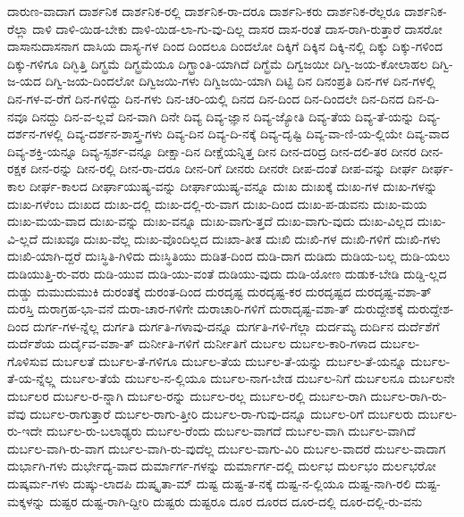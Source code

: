 {ದಾರುಣ-ವಾದಾಗ
ದಾರ್ಶನಿಕ
ದಾರ್ಶನಿಕ-ರಲ್ಲಿ
ದಾರ್ಶನಿಕ-ರಾ-ದರೂ
ದಾರ್ಶನಿ-ಕರು
ದಾರ್ಶನಿಕ-ರೆಲ್ಲರೂ
ದಾರ್ಶನಿಕ-ರೆಲ್ಲಾ
ದಾಳಿ
ದಾಳಿ-ಯಿಡ-ಬೇಕು
ದಾಳಿ-ಯಿಡ-ಲಾ-ಗು-ವು-ದಿಲ್ಲ
ದಾಸರ
ದಾಸ-ರಂತೆ
ದಾಸ-ರಾಗಿ-ರುತ್ತಾರೆ
ದಾಸರೋ
ದಾಸಾನುದಾಸನಾಗ
ದಾಸಿಯ
ದಾಸ್ಯ-ಗಳ
ದಿಂದ
ದಿಂದಲೂ
ದಿಂದಲೋ
ದಿಕ್ಕಿಗೆ
ದಿಕ್ಕಿನ
ದಿಕ್ಕಿ-ನಲ್ಲಿ
ದಿಕ್ಕು
ದಿಕ್ಕು-ಗಳಿಂದ
ದಿಕ್ಕು-ಗಳಿಗೂ
ದಿಗ್ಭಿತ್ತಿ
ದಿಗ್ಭ್ರಮೆ
ದಿಗ್ಭ್ರಮೆಯೂ
ದಿಗ್ಭ್ರಾಂತಿ-ಯಾಗಿದೆ
ದಿಗ್ಭ್ರೆಮೆ
ದಿಗ್ವಜಯೀ
ದಿಗ್ವಿ-ಜಯ-ಕೋಲಾಹಲ
ದಿಗ್ವಿ-ಜ-ಯದ
ದಿಗ್ವಿ-ಜಯ-ದಿಂದಲೋ
ದಿಗ್ವಿಜಯಿ-ಗಳು
ದಿಗ್ವಿಜಯಿ-ಯಾಗಿ
ದಿಟ್ಟಿ
ದಿನ
ದಿನಂಪ್ರತಿ
ದಿನ-ಗಳ
ದಿನ-ಗಳಲ್ಲಿ
ದಿನ-ಗಳ-ವ-ರೆಗೆ
ದಿನ-ಗಳಿದ್ದು
ದಿನ-ಗಳು
ದಿನ-ಚರಿ-ಯಲ್ಲಿ
ದಿನದ
ದಿನ-ದಿಂದ
ದಿನ-ದಿಂದಲೇ
ದಿನ-ದಿನದ
ದಿನ-ದಿ-ನವೂ
ದಿನದ್ದು
ದಿನ-ವ-ಲ್ಲವೆ
ದಿನ-ವಾಗಿ
ದಿನೇ
ದಿವ್ಯ
ದಿವ್ಯ-ಜ್ಞಾನ
ದಿವ್ಯ-ಜ್ಯೋತಿ
ದಿವ್ಯ-ತೆಯ
ದಿವ್ಯ-ತೆ-ಯನ್ನು
ದಿವ್ಯ-ದರ್ಶನ-ಗಳಲ್ಲಿ
ದಿವ್ಯ-ದರ್ಶನ-ಶಾಸ್ತ್ರ-ಗಳು
ದಿವ್ಯ-ದಿನ
ದಿವ್ಯ-ದಿ-ನಕ್ಕೆ
ದಿವ್ಯ-ದೃಷ್ಟಿ
ದಿವ್ಯ-ವಾ-ಣಿ-ಯ-ಲ್ಲಿಯೇ
ದಿವ್ಯ-ವಾದ
ದಿವ್ಯ-ಶಕ್ತಿ-ಯನ್ನೂ
ದಿವ್ಯ-ಸ್ಪರ್ಶ-ವನ್ನೂ
ದೀಕ್ಷಾ-ದಿನ
ದೀಕ್ಷೆಯನ್ನಿತ್ತ
ದೀನ
ದೀನ-ದರಿದ್ರ
ದೀನ-ದಲಿ-ತರ
ದೀನರ
ದೀನ-ರಕ್ಷಕ
ದೀನ-ರನ್ನು
ದೀನ-ರಲ್ಲಿ
ದೀನ-ರಾ-ದರೂ
ದೀನ-ರಿಗೆ
ದೀನರು
ದೀನರೇ
ದೀಪ-ದಂತೆ
ದೀಪ-ವನ್ನು
ದೀರ್ಘ
ದೀರ್ಘ-ಕಾಲ
ದೀರ್ಘ-ಕಾಲದ
ದೀರ್ಘಾಯುಷ್ಯ-ವನ್ನು
ದೀರ್ಘಾಯುಷ್ಯ-ವನ್ನೂ
ದುಃಖ
ದುಃಖಕ್ಕೆ
ದುಃಖ-ಗಳ
ದುಃಖ-ಗಳನ್ನು
ದುಃಖ-ಗಳೆಂಬ
ದುಃಖದ
ದುಃಖ-ದಲ್ಲಿ
ದುಃಖ-ದಲ್ಲಿ-ರು-ವಾಗ
ದುಃಖ-ದಿಂದ
ದುಃಖ-ಪ-ಡುವನು
ದುಃಖ-ಮಯ
ದುಃಖ-ಮಯ-ವಾದ
ದುಃಖ-ವನ್ನು
ದುಃಖ-ವನ್ನೂ
ದುಃಖ-ವಾಗು-ತ್ತದೆ
ದುಃಖ-ವಾಗು-ವುದು
ದುಃಖ-ವಿಲ್ಲದ
ದುಃಖ-ವಿ-ಲ್ಲದೆ
ದುಃಖವೂ
ದುಃಖ-ವೆಲ್ಲ
ದುಃಖ-ವೊಂದಿಲ್ಲದ
ದುಃಖಾ-ತೀತ
ದುಃಖಿ
ದುಃಖಿ-ಗಳ
ದುಃಖಿ-ಗಳಿಗೆ
ದುಃಖಿ-ಗಳು
ದುಃಖಿ-ಯಾಗಿ-ದ್ದರೆ
ದುಃಸ್ಥಿತಿ-ಗಿಳಿದು
ದುಃಸ್ಥಿತಿಯು
ದುಡಿತ-ದಿಂದ
ದುಡಿ-ದಾಗ
ದುಡಿದು
ದುಡಿಯ-ಬಲ್ಲ
ದುಡಿ-ಯಲು
ದುಡಿಯುತ್ತಿ-ರು-ವರು
ದುಡಿ-ಯುವ
ದುಡಿ-ಯು-ವಂತೆ
ದುಡಿಯು-ವುದು
ದುಡಿ-ಯೋಣ
ದುಡುಕ-ಬೇಡಿ
ದುಡ್ಡಿ-ಲ್ಲದ
ದುಡ್ಡು
ದುಮುದುಮುಕಿ
ದುರಂತಕ್ಕೆ
ದುರಂತ-ದಿಂದ
ದುರದೃಷ್ಟ
ದುರದೃಷ್ಟ-ಕರ
ದುರದೃಷ್ಟದ
ದುರದೃಷ್ಟ-ವಶಾ-ತ್
ದುರಸ್ತಿ
ದುರಾಗ್ರಹ-ಭಾ-ವನೆ
ದುರಾ-ಚಾರ-ಗಳಿಗೇ
ದುರಾಚಾರಿ-ಗಳಿಗೆ
ದುರಾದೃಷ್ಟ-ವಶಾ-ತ್
ದುರುದ್ದೇಶಕ್ಕೆ
ದುರುದ್ದೇಶ-ದಿಂದ
ದುರ್ಗ-ಗಳ-ನ್ನೆಲ್ಲ
ದುರ್ಗತಿ
ದುರ್ಗತಿ-ಗಳಾವು-ದನ್ನೂ
ದುರ್ಗತಿ-ಗಳಿ-ಗೆಲ್ಲಾ
ದುರ್ದಮ್ಯ
ದುರ್ದಿನ
ದುರ್ದೆಶೆಗೆ
ದುರ್ದೆಶೆಯ
ದುರ್ದೈವ-ವಶಾ-ತ್
ದುರ್ನೀತಿ-ಗಳಿಗೆ
ದುರ್ನೀತಿಗೆ
ದುರ್ಬಲ
ದುರ್ಬಲ-ಕಾರಿ-ಗಳಾದ
ದುರ್ಬಲ-ಗೊಳಿಸುವ
ದುರ್ಬಲತೆ
ದುರ್ಬಲ-ತೆ-ಗಳಿಗೂ
ದುರ್ಬಲ-ತೆಯ
ದುರ್ಬಲ-ತೆ-ಯನ್ನು
ದುರ್ಬಲ-ತೆ-ಯನ್ನೂ
ದುರ್ಬಲ-ತೆ-ಯ-ನ್ನೆಲ್ಲ್ಲ
ದುರ್ಬಲ-ತೆಯೆ
ದುರ್ಬಲ-ನ-ಲ್ಲಿಯೂ
ದುರ್ಬಲ-ನಾಗ-ಬೇಡ
ದುರ್ಬಲ-ನಿಗೆ
ದುರ್ಬಲನೂ
ದುರ್ಬಲನೇ
ದುರ್ಬಲರ
ದುರ್ಬಲ-ರ-ನ್ನಾಗಿ
ದುರ್ಬಲ-ರನ್ನು
ದುರ್ಬಲ-ರಲ್ಲ
ದುರ್ಬಲ-ರಲ್ಲಿ
ದುರ್ಬಲ-ರಾಗಿ
ದುರ್ಬಲ-ರಾಗಿ-ರು-ವೆವು
ದುರ್ಬಲ-ರಾಗುತ್ತಾರೆ
ದುರ್ಬಲ-ರಾಗು-ತ್ತೀರಿ
ದುರ್ಬಲ-ರಾ-ಗುವು-ದನ್ನೂ
ದುರ್ಬಲ-ರಿಗೆ
ದುರ್ಬಲರು
ದುರ್ಬಲ-ರು-ಇದೇ
ದುರ್ಬಲ-ರು-ಬಲಾಢ್ಯರು
ದುರ್ಬಲ-ರೆಂದು
ದುರ್ಬಲ-ವಾಗದೆ
ದುರ್ಬಲ-ವಾಗಿ
ದುರ್ಬಲ-ವಾಗಿದೆ
ದುರ್ಬಲ-ವಾಗಿ-ರು-ವಾಗ
ದುರ್ಬಲ-ವಾಗಿ-ರು-ವುದೆಲ್ಲ
ದುರ್ಬಲ-ವಾಗು-ವಿರಿ
ದುರ್ಬಲ-ವಾದರೆ
ದುರ್ಬಲ-ವಾದಾಗ
ದುರ್ಭಾಗಿ-ಗಳು
ದುರ್ಭೇದ್ಯ-ವಾದ
ದುರ್ಮಾರ್ಗ-ಗಳನ್ನು
ದುರ್ಮಾರ್ಗ-ದಲ್ಲಿ
ದುರ್ಲಭ
ದುರ್ಲಭಂ
ದುರ್ಲಭರೋ
ದುಷ್ಕರ್ಮ-ಗಳು
ದುಷ್ಕು-ಲಾದಪಿ
ದುಷ್ಕೃತಾ-ಮ್
ದುಷ್ಟ
ದುಷ್ಟ-ತ-ನಕ್ಕೆ
ದುಷ್ಟ-ನ-ಲ್ಲಿಯೂ
ದುಷ್ಟ-ನಾಗಿ-ರಲಿ
ದುಷ್ಟ-ಮಕ್ಕಳನ್ನು
ದುಷ್ಟರ
ದುಷ್ಟ-ರಾಗಿ-ದ್ದೀರಿ
ದುಷ್ಟರು
ದುಷ್ಟರೂ
ದೂರ
ದೂರದ
ದೂರ-ದಲ್ಲಿ
ದೂರ-ದಲ್ಲಿ-ರು-ವನು
}
